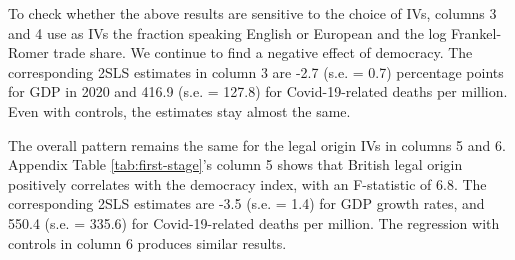
To check whether the above results are sensitive to the choice of IVs, columns 3 and 4 use as IVs the fraction speaking English or European and the log Frankel-Romer trade share. We continue to find a negative effect of democracy. %
The corresponding 2SLS estimates in column 3 are -2.7 (s.e. = 0.7) percentage points for GDP in 2020 and 416.9 (s.e. = 127.8) for Covid-19-related deaths per million. Even with controls, the estimates stay almost the same. 


The overall pattern remains the same for the legal origin IVs in columns 5 and 6. Appendix Table \ref{tab:first-stage}'s column 5 shows that British legal origin positively correlates with the democracy index, with an F-statistic of 6.8. The corresponding 2SLS estimates are -3.5 (s.e. = 1.4) for GDP growth rates, and 550.4 (s.e. = 335.6) for Covid-19-related deaths per million. The regression with controls in column 6 produces similar results.


